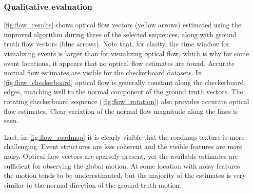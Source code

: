 \subsubsection{Qualitative evaluation}
\cref{fig:flow_results} shows optical flow vectors (yellow arrows) estimated using the improved algorithm during three of the selected sequences, along with ground truth flow vectors (blue arrows). Note that, for clarity, the time window for visualizing events is larger than for visualizing optical flow, which is why for some event locations, it appears that no optical flow estimates are found. Accurate normal flow estimates are visible for the checkerboard datasets. In \cref{fig:flow_checkerboard} optical flow is generally constant along the checkerboard edges, matching well to the normal component of the ground truth vectors. The rotating checkerboard sequence (\cref{fig:flow_rotation}) also provides accurate optical flow estimates. Clear variation of the normal flow magnitude along the lines is seen. 

\begin{figure*}[!ht]
	\begin{framed}
		\centering
		\caption{Optical flow estimated in several sequences, shown as yellow arrows. The accompanying blue arrows show the ground truth optical flow. Events are shown as green dots (positive polarity) or red dots (negative polarity). The time window for displaying optical flow in each sequence is 10 ms. To better visualize the event input, a larger window of 50 ms is applied for the events.}
		\label{fig:flow_results}
	\end{framed}
\end{figure*}

Last, in \cref{fig:flow_roadmap} it is clearly visible that the roadmap texture is more challenging. Event structures are less coherent and the visible features are more noisy. Optical flow vectors are sparsely present, yet the available estimates are sufficient for observing the global motion. At some location with noisy features the motion tends to be underestimated, but the majority of the estimates is very similar to the normal direction of the ground truth motion.


